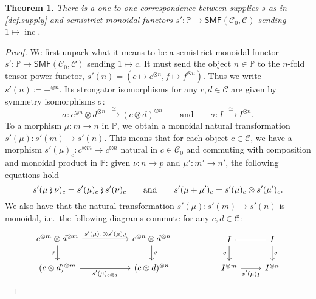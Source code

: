 \documentclass[11pt, oneside, article]{memoir}
\theoremstyle{plain}
\newtheorem{theorem}{Theorem}[chapter]
\theoremstyle{definition}
\theoremstyle{remark}
\newcommand{\cat}[1]{\mathcal{#1}}%
\newcommand{\Cat}[1]{{\mathsf{#1}}}%
\DeclareMathOperator{\inc}{inc}
\newcommand{\tpow}[1]{^{\otimes #1}}
\newcommand{\smf}{\Cat{SMF}}
\newcommand{\pp}{\mathbb{P}}
\newcommand{\mob}[1]{#1_0}
\newcommand{\cp}{\mathbin{\fatsemi}}
\newcommand{\To}[1]{\xrightarrow{#1}}
\newcommand{\Too}[1]{\To{\;\;#1\;\;}}
\newcommand{\qqand}{\qquad\text{and}\qquad}
\begin{document}
\begin{theorem}\label{thm.supply_v2}
There is a one-to-one correspondence between supplies $s$ as in \cref{def.supply} and semistrict monoidal functors $s'\colon\pp\to\smf(\mob{\cat{C}},\cat{C})$ sending $1\mapsto\inc$.
\end{theorem}\begin{proof}
We first unpack what it means to be a semistrict monoidal functor $s'\colon\pp\to\smf(\mob{\cat{C}},\cat{C})$ sending $1\mapsto c$. It must send the object $n\in\pp$ to the $n$-fold tensor power functor, $s'(n)=(c\mapsto c\tpow{n}, f\mapsto f\tpow{n})$. Thus we write $s'(n)\coloneqq -\tpow{n}$. Its strongator isomorphisms for any $c,d\in\cat{C}$ are given by symmetry isomorphisms $\sigma$:
\begin{equation}\label{eqn.symmetry_c1c2}
  \sigma\colon 
  c\tpow{n}\otimes d\tpow{n}
  \Too{\cong}
  (c\otimes d)\tpow{n}
  \qqand
  \sigma\colon I\Too{\cong}I\tpow{n}.
\end{equation}
To a morphism $\mu\colon m\to n$ in $\pp$, we obtain a monoidal natural transformation $s'(\mu)\colon s'(m)\to s'(n)$. This means that for each object $c\in\cat{C}$, we have a morphism $s'(\mu)_c\colon c\tpow{m}\to c\tpow{n}$ natural in $c\in\mob{\cat{C}}$ and commuting with composition and monoidal product in $\pp$: given $\nu\colon n\to p$ and $\mu'\colon m'\to n'$, the following equations hold
\begin{equation}\label{eqn.supply_composition}
  s'(\mu\cp\nu)_c=s'(\mu)_c\cp s'(\nu)_c
  \qqand
	s'(\mu+\mu')_c=s'(\mu)_c\otimes s'(\mu')_c.
\end{equation}
We also have that the natural transformation $s'(\mu)\colon s'(m)\to s'(n)$ is monoidal, i.e.\ the following diagrams commute for any $c,d\in\cat{C}$:
\begin{equation}\label{eqn.supply_commute_tensors_v2}
\begin{tikzcd}[column sep=55pt]
	c\tpow{m}\otimes d\tpow{m}\ar[r, "s'(\mu)_c\otimes s'(\mu)_d"]\ar[d, "\sigma"']&
	c\tpow{n}\otimes d\tpow{n}\ar[d, "\sigma"]\\
	(c\otimes d)\tpow{m}\ar[r, "s'(\mu)_{c\otimes d}"']&
	(c\otimes d)\tpow{n}
\end{tikzcd}
\hspace{.7in}
\begin{tikzcd}
	I\ar[r, equal]\ar[d, "\sigma"']&
	I\ar[d, "\sigma"]\\
	I\tpow{m}\ar[r, "s'(\mu)_I"']&
	I\tpow{n}
\end{tikzcd}
\end{equation}
 

\end{proof}
\end{document}
